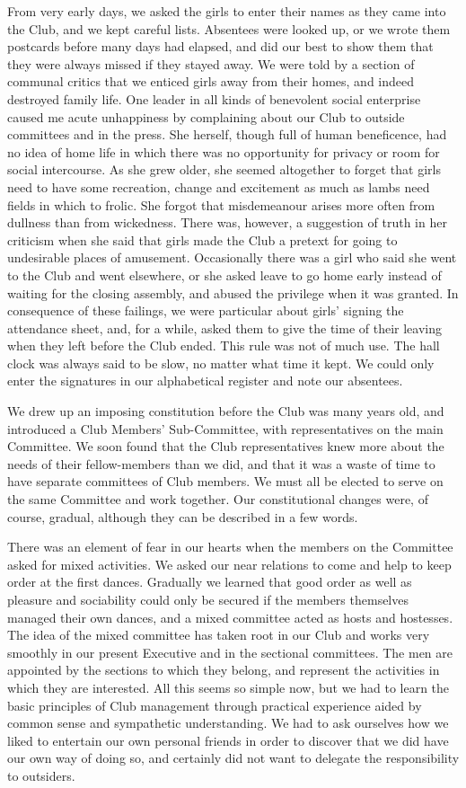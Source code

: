 From very early days, we asked the girls to enter their
names as they came into the Club, and we kept careful
lists. Absentees were looked up, or we wrote them
postcards before many days had elapsed, and did our best to
show them that they were always missed if they stayed
away. We were told by a section of communal critics
that we enticed girls away from their homes, and indeed
destroyed family life. One leader in all kinds of benevolent
social enterprise caused me acute unhappiness by
complaining about our Club to outside committees and
in the press. She herself, though full of human beneficence,
had no idea of home life in which there was no
opportunity for privacy or room for social intercourse.
As she grew older, she seemed altogether to forget that
girls need to have some recreation, change and excitement
as much as lambs need fields in which to frolic.
She forgot that misdemeanour arises more often from
dullness than from wickedness. There was, however, a
suggestion of truth in her criticism when she said that
girls made the Club a pretext for going to undesirable
places of amusement. Occasionally there was a girl who
said she went to the Club and went elsewhere, or she
asked leave to go home early instead of waiting for the
closing assembly, and abused the privilege when it was
granted. In consequence of these failings, we were particular
about girls’ signing the attendance sheet, and, for
a while, asked them to give the time of their leaving
when they left before the Club ended. This rule was
not of much use. The hall clock was always said to be
slow, no matter what time it kept. We could only enter
the signatures in our alphabetical register and note our
absentees.

We drew up an imposing constitution before the Club
was many years old, and introduced a Club Members’
Sub-Committee, with representatives on the main Committee.
We soon found that the Club representatives
knew more about the needs of their fellow-members than
we did, and that it was a waste of time to have separate
committees of Club members. We must all be elected to
serve on the same Committee and work together. Our
constitutional changes were, of course, gradual, although
they can be described in a few words.

There was an element of fear in our hearts when the
members on the Committee asked for mixed activities.
We asked our near relations to come and help to keep
order at the first dances. Gradually we learned that good
order as well as pleasure and sociability could only be
secured if the members themselves managed their own
dances, and a mixed committee acted as hosts and
hostesses. The idea of the mixed committee has taken
root in our Club and works very smoothly in our present
Executive and in the sectional committees. The men
are appointed by the sections to which they belong, and
represent the activities in which they are interested. All
this seems so simple now, but we had to learn the basic
principles of Club management through practical experience
aided by common sense and sympathetic understanding.
We had to ask ourselves how we liked to entertain
our own personal friends in order to discover that we did
have our own way of doing so, and certainly did not want
to delegate the responsibility to outsiders.

